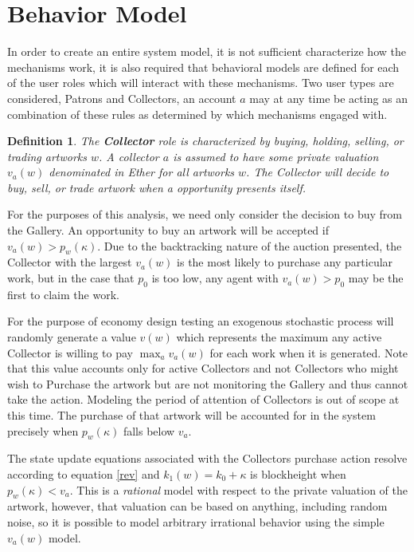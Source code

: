 \documentclass[11pt]{amsart}
\newtheorem{definition}{Definition}
\begin{document}

\section{Behavior Model}

In order to create an entire system model, it is not sufficient characterize how the mechanisms work, it is also required that behavioral models are defined for each of the user roles which will interact with these mechanisms. Two user types are considered, Patrons and Collectors, an account $a$ may at any time be acting as an combination of these rules as determined by which mechanisms engaged with.

\begin{definition}
The \textbf{Collector} role is characterized by buying, holding, selling, or trading artworks $w$.  A collector $a$ is assumed to have some private valuation $v_a(w)$ denominated in Ether for all artworks $w$. The Collector will decide to buy, sell, or trade artwork when a opportunity presents itself.
\end{definition}

For the purposes of this analysis, we need only consider the decision to buy from the Gallery. An opportunity to buy an artwork will be accepted if $v_a(w)>p_w(\kappa)$. Due to the backtracking nature of the auction presented, the Collector with the largest $v_a(w)$ is the most likely to purchase any particular work, but in the case that $p_0$ is too low, any agent with $v_a(w)>p_0$ may be the first to claim the work.

For the purpose of economy design testing an exogenous stochastic process will randomly generate a value $v(w)$ which represents the maximum any active Collector is willing to pay $\max_a v_a(w)$ for each work when it is generated. Note that this value accounts only for active Collectors and not Collectors who might wish to Purchase the artwork but are not monitoring the Gallery and thus cannot take the action. Modeling the period of attention of Collectors is out of scope at this time. The purchase of that artwork will be accounted for in the system precisely when $p_w(\kappa)$ falls below $v_a$.

The state update equations associated with the Collectors purchase action resolve according to equation \eqref{rev} and $k_1(w)=k_0+\kappa$ is blockheight when $p_w(\kappa)< v_a$.  This is a \textit{rational} model with respect to the private valuation of the artwork, however, that valuation can be based on anything, including random noise, so it is possible to model arbitrary irrational behavior using the simple $v_a(w)$ model.
\end{document}
